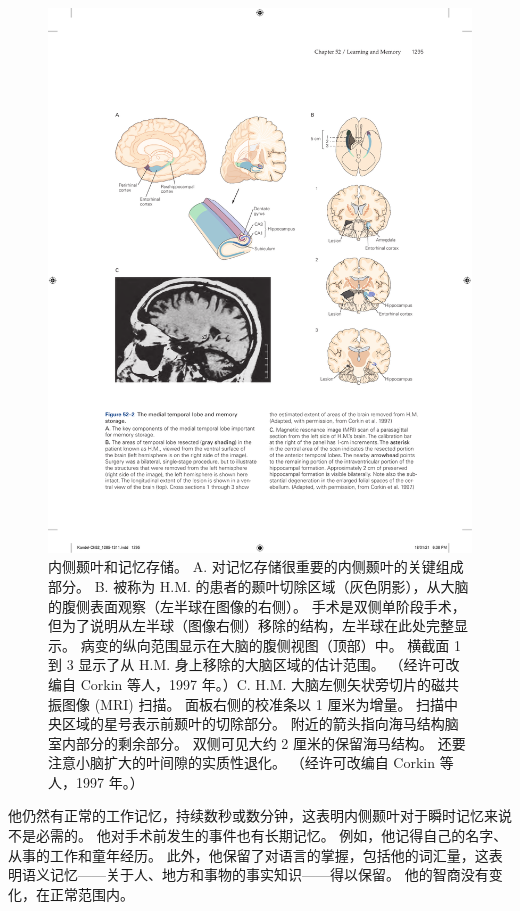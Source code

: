 \begin{figure}[htbp]
	\centering
	\includegraphics[width=0.9\linewidth]{chap52/fig_52_2}
	\caption{内侧颞叶和记忆存储。 A. 对记忆存储很重要的内侧颞叶的关键组成部分。 B. 被称为 H.M. 的患者的颞叶切除区域（灰色阴影），从大脑的腹侧表面观察（左半球在图像的右侧）。 手术是双侧单阶段手术，但为了说明从左半球（图像右侧）移除的结构，左半球在此处完整显示。 病变的纵向范围显示在大脑的腹侧视图（顶部）中。 横截面 1 到 3 显示了从 H.M. 身上移除的大脑区域的估计范围。 （经许可改编自 Corkin 等人，1997 年。）C. H.M. 大脑左侧矢状旁切片的磁共振图像 (MRI) 扫描。 面板右侧的校准条以 1 厘米为增量。 扫描中央区域的星号表示前颞叶的切除部分。 附近的箭头指向海马结构脑室内部分的剩余部分。 双侧可见大约 2 厘米的保留海马结构。 还要注意小脑扩大的叶间隙的实质性退化。 （经许可改编自 Corkin 等人，1997 年。）}
	\label{fig:52_2}
\end{figure}

他仍然有正常的工作记忆，持续数秒或数分钟，这表明内侧颞叶对于瞬时记忆来说不是必需的。 他对手术前发生的事件也有长期记忆。 例如，他记得自己的名字、从事的工作和童年经历。 此外，他保留了对语言的掌握，包括他的词汇量，这表明语义记忆——关于人、地方和事物的事实知识——得以保留。 他的智商没有变化，在正常范围内。

